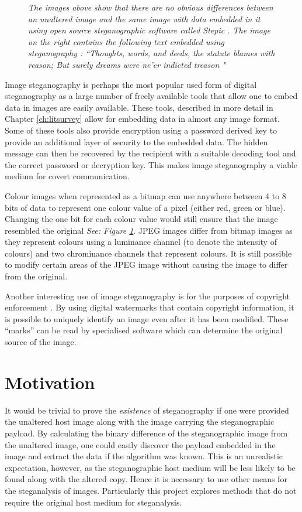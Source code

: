 \begin{figure}[h!]
\caption{\emph{The images above show that there are no obvious differences between an unaltered image and the same image with data embedded in it using open source steganographic software called Stepic \cite{stepnic}. The image on the right contains the following text embedded using steganography : ``Thoughts, words, and deeds, the statute blames with reason;  But surely dreams were ne'er indicted treason \cite{burns}"}}
\label{fig:stegexample}
\end{figure} 
Image steganography is perhaps the most popular used form of digital steganography as a large number of freely available tools that allow one to embed data in images are easily available. These tools, described in more detail in Chapter \ref{ch:litsurvey} allow for embedding data in almost any image format. Some of these tools also provide encryption using a password derived key to provide an additional layer of security to the embedded data. The hidden message can then be recovered by the recipient with a suitable decoding tool and the correct password or decryption key. This makes image steganography a viable medium for covert communication.  

Colour images when represented as a bitmap can use anywhere between 4 to 8 bits of data to represent one colour value of a pixel (either red, green or blue). Changing the one bit for each colour value would still ensure that the image resembled the original \emph{See: Figure \ref{fig:stegexample}}. JPEG images differ from bitmap images as they represent colours using a luminance channel (to denote the intensity of colours) and two chrominance channels that represent colours. It is still possible to modify certain areas of the JPEG image without causing the image to differ from the original.  

Another interesting use of image steganography is for the purposes of copyright enforcement  \cite{kundur2002digital}. By using digital watermarks that contain copyright information,  it is possible to uniquely identify an image even after it has  been modified. These ``marks'' can be read by specialised software which can determine the original source of the image.
\section{Motivation}
\label{sec:motivation}
It would be trivial to prove the \emph{existence} of steganography if one were provided the unaltered host image along with the image carrying the steganographic payload. By calculating the binary difference of the steganographic image from the unaltered image, one could easily discover the payload embedded in the image and extract the data if the algorithm was known. This is an unrealistic expectation, however,  as the steganographic host medium will be less likely to be found along with the altered copy. Hence it is necessary to use other means for the steganalysis of images. Particularly this project explores methods that do not require the original host medium for steganalysis.
